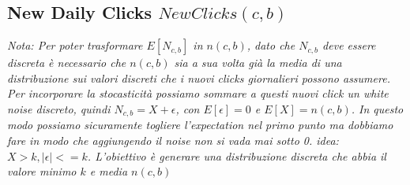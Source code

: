 \documentclass[11pt]{article} %
\begin{document}
\subsection{New Daily Clicks $NewClicks(c,b)$}
\textit{{\color{red}Nota: Per poter trasformare $E[N_{c,b}]$ in $n(c,b)$, dato che $N_{c,b}$ deve essere discreta è necessario che $n(c,b)$ sia a sua volta già la media di una distribuzione sui valori discreti che i nuovi clicks giornalieri possono assumere. Per incorporare la stocasticità possiamo sommare a questi nuovi click un white noise discreto, quindi $N_{c,b}=X+\epsilon$, con $E[\epsilon]=0$ e  $E[X] = n(c,b)$. In questo modo possiamo sicuramente togliere l'expectation nel primo punto ma dobbiamo fare in modo che aggiungendo il noise non si vada mai sotto 0. idea: $X>k,|\epsilon| <=k$. L'obiettivo è generare una distribuzione discreta che abbia il valore minimo $k$ e media $n(c,b)$}}
\newline
\newline
\end{document}
